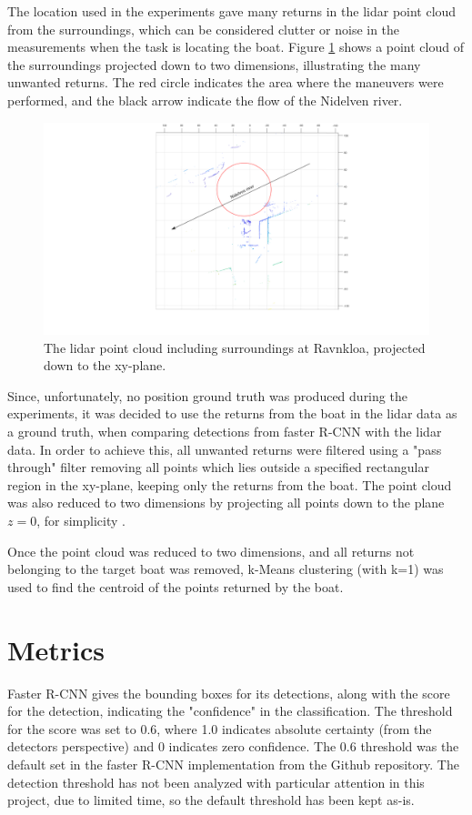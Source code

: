 The location used in the experiments gave many returns in the lidar point cloud from the surroundings, which can be considered clutter or noise in the measurements when the task is locating the boat. Figure \ref{fig:ravnkloa_pointcloud} shows a point cloud of the surroundings projected down to two dimensions, illustrating the many unwanted returns. The red circle indicates the area where the maneuvers were performed, and the black arrow indicate the flow of the Nidelven river. 
\begin{figure}[H]
	\centering
	\includegraphics[width=\linewidth]{fig/ravnkloa_surroundings.png}
	\caption{The lidar point cloud including surroundings at Ravnkloa, projected down to the xy-plane.}
	\label{fig:ravnkloa_pointcloud}
\end{figure}
Since, unfortunately, no position ground truth was produced during the experiments, it was decided to use the returns from the boat in the lidar data as a ground truth, when comparing detections from faster R-CNN with the lidar data. In order to achieve this, all unwanted returns were filtered using a "pass through" filter removing all points which lies outside a specified rectangular region in the xy-plane, keeping only the returns from the boat. The point cloud was also reduced to two dimensions by projecting all points down to the plane $z=0$, for simplicity .

Once the point cloud was reduced to two dimensions, and all returns not belonging to the target boat was removed, k-Means clustering (with k=1) was used to find the centroid of the points returned by the boat.
\section{Metrics}
Faster R-CNN gives the bounding boxes for its detections, along with the score for the detection, indicating the "confidence" in the classification. The threshold for the score was set to 0.6, where 1.0 indicates absolute certainty (from the detectors perspective) and 0 indicates zero confidence. The 0.6 threshold was the default set in the faster R-CNN implementation from the Github repository. The detection threshold has not been analyzed with particular attention in this project, due to limited time, so the default threshold has been kept as-is.

